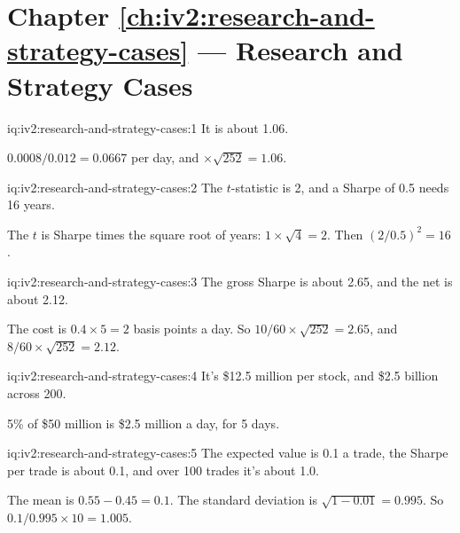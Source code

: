 \section*{Chapter \ref{ch:iv2:research-and-strategy-cases} --- Research and Strategy Cases}

\begin{solution}{iq:iv2:research-and-strategy-cases:1}
It is about 1.06.

$0.0008/0.012 = 0.0667$ per day, and $\times\sqrt{252} = 1.06$.

\end{solution}

\begin{solution}{iq:iv2:research-and-strategy-cases:2}
The $t$-statistic is 2, and a Sharpe of 0.5 needs 16 years.

The $t$ is Sharpe times the square root of years: $1 \times \sqrt{4} = 2$. Then $(2/0.5)^2 = 16$.

\end{solution}

\begin{solution}{iq:iv2:research-and-strategy-cases:3}
The gross Sharpe is about 2.65, and the net is about 2.12.

The cost is $0.4 \times 5 = 2$ basis points a day. So $10/60 \times \sqrt{252} = 2.65$, and $8/60 \times \sqrt{252} = 2.12$.

\end{solution}

\begin{solution}{iq:iv2:research-and-strategy-cases:4}
It's \$12.5 million per stock, and \$2.5 billion across 200.

5\% of \$50 million is \$2.5 million a day, for 5 days.

\end{solution}

\begin{solution}{iq:iv2:research-and-strategy-cases:5}
The expected value is 0.1 a trade, the Sharpe per trade is about 0.1, and over 100 trades it's about 1.0.

The mean is $0.55 - 0.45 = 0.1$. The standard deviation is $\sqrt{1 - 0.01} = 0.995$. So $0.1/0.995 \times 10 = 1.005$.

\end{solution}

